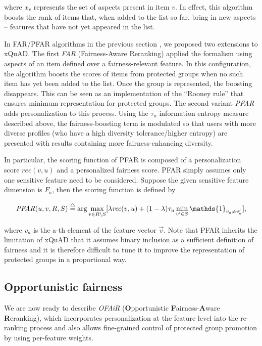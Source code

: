 \noindent where $x_v$ represents the set of aspects present in item $v$. In effect, this algorithm boosts the rank of items that, when added to the list so far, bring in new aspects -- features that have not yet appeared in the list. 

In FAR/PFAR algorithms in the previous section \cite{liu2018personalizing,liu2019personalized}, we proposed two extensions to xQuAD. The first \textit{FAR} (Fairness-Aware Reranking) applied the formalism using aspects of an item defined over a fairness-relevant feature. In this configuration, the algorithm boosts the scores of items from protected groups when no such item has yet been added to the list. Once the group is represented, the boosting disappears. This can be seen as an implementation of the ``Rooney rule'' \cite{kleinberg2018selection} that ensures minimum representation for protected groups. The second variant \textit{PFAR} adds personalization to this process. Using the $\tau_u$ information entropy measure described above, the fairness-boosting term is modulated so that users with more diverse profiles (who have a high diversity tolerance/higher entropy) are presented with results containing more fairness-enhancing diversity.

In particular, the scoring function of PFAR is composed of a personalization score $\mathit{rec}(v,u)$ and a personalized fairness score. PFAR simply assumes only one sensitive feature need to be considered. Suppose the given sensitive feature dimension is $F_a$, then the scoring function is defined by

\begin{equation}
    \mathit{PFAR}(u,v,R,S)\buildrel\triangle\over= \arg\max_{v \in R \setminus S}[\lambda\mathit{rec}(v,u) + (1-\lambda)\tau_u \min_{v' \in S} \mathds{1}_{v_{a} \neq v'_{a}}],
\end{equation}

where $v_{a}$ is the a-th element of the feature vector $\vec{v}$.
Note that PFAR inherits the limitation of xQuAD that it assumes binary inclusion as a sufficient definition of fairness and it is therefore difficult to tune it to improve the representation of protected groups in a proportional way. 


\subsection{\textbf{Opportunistic fairness}}
\label{subsec:ofair_opp_fair}

We are now ready to describe \textit{OFAiR} (\textbf{O}pportunistic \textbf{F}airness-\textbf{A}ware \textbf{R}eranking), which incorporates personalization at the feature level into the re-ranking process and also allows fine-grained control of protected group promotion by using per-feature weights. 

